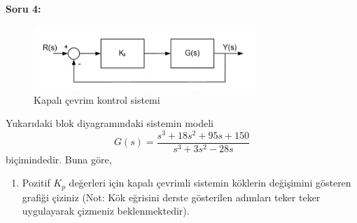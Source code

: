 \documentclass[a4paper,11pt]{article}
\begin{document}
\textbf{Soru 4:}
\begin{figure}[h]
    \centering
    \includegraphics[width=0.75\textwidth]{fig4.png}
    \caption{Kapalı çevrim kontrol sistemi}
    \label{fig:5}
\end{figure}
Yukarıdaki blok diyagramındaki sistemin modeli \[ G(s) = \frac{s^3 + 18s^2 + 95s + 150}{s^3 + 3s^2 - 28s} \] biçimindedir. Buna göre,
\begin{enumerate}[label=\textbf{\alph*}{.}]
\item Pozitif $K_p$ değerleri için kapalı çevrimli sistemin köklerin değişimini gösteren grafiği çiziniz (Not: Kök eğrisini derste gösterilen adımları teker teker uygulayarak çizmeniz beklenmektedir).


\end{enumerate}
\end{document}
